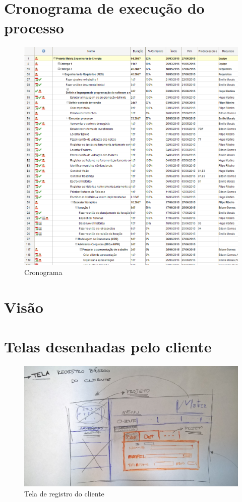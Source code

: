 \begin{apendicesenv}

\partapendices

\chapter{Cronograma de execução do processo}
\begin{figure}[!htb]
\centering
\includegraphics[scale=0.55]{figuras/cronograma_execucao.png}
\caption{Cronograma}
\end{figure}



\chapter{Visão}
  \label{visao}

\chapter{Telas desenhadas pelo cliente} 
\label{telas}

\begin{figure}[!htb]
\centering
\includegraphics[scale=0.08]{figuras/tela01.jpg}
\caption{Tela de registro do cliente}
\end{figure}


\end{apendicesenv}
